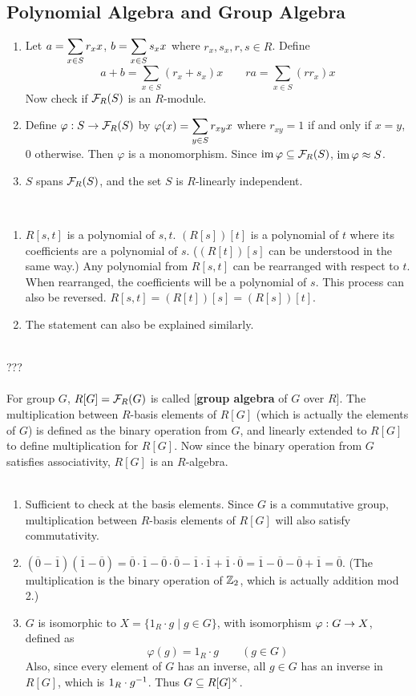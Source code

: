 \subsection{Polynomial Algebra and Group Algebra}
\begin{enumerate}
	\item Let $\displaystyle a = \sum_{x\in S} r_x x$, $\displaystyle b = \sum_{x\in S}s_x x$ where $r_x, s_x, r, s\in R$. Define
	$$a+b = \sum_{x\in S}(r_x+s_x)x \qquad ra = \sum_{x\in S}(rr_x)x$$
	Now check if $\mathcal{F}_R(S)$ is an $R$-module.
	\item Define $\varphi: S\rightarrow \mathcal{F}_R(S)$ by $\varphi(x) = \displaystyle \sum_{y\in S} r_{xy} x$ where $r_{xy} = 1$ if and only if $x = y$, 0 otherwise. Then $\varphi$ is a monomorphism. Since $\operatorname{im} \varphi \subseteq \mathcal{F}_R(S)$, $\operatorname{im} \varphi \approx S$.
	\item $S$ spans $\mathcal{F}_R(S)$, and the set $S$ is $R$-linearly independent.
\end{enumerate}~
\\
\begin{enumerate}
	\item $R[s, t]$ is a polynomial of $s, t$. $(R[s])[t]$ is a polynomial of $t$ where its coefficients are a polynomial of $s$. ($(R[t])[s]$ can be understood in the same way.) Any polynomial from $R[s, t]$ can be rearranged with respect to $t$. When rearranged, the coefficients will be a polynomial of $s$. This process can also be reversed. $R[s, t] = (R[t])[s] = (R[s])[t]$.
	\item The statement can also be explained similarly.
\end{enumerate}~
\\
 ???\\
\\
 For group $G$, $R[G] = \mathcal{F}_R(G)$ is called [\textbf{group algebra} of $G$ over $R$]. The multiplication between $R$-basis elements of $R[G]$ (which is actually the elements of $G$) is defined as the binary operation from $G$, and linearly extended to $R[G]$ to define multiplication for $R[G]$. Now since the binary operation from $G$ satisfies associativity, $R[G]$ is an $R$-algebra.\\
\\
\begin{enumerate}
	\item Sufficient to check at the basis elements. Since $G$ is a commutative group, multiplication between $R$-basis elements of $R[G]$ will also satisfy commutativity.
	\item $(\overline{0} - \overline{1})(\overline{1}-\overline{0}) = \overline{0}\cdot \overline{1} - \overline{0}\cdot\overline{0} - \overline{1}\cdot\overline{1}+\overline{1}\cdot\overline{0} = \overline{1} - \overline{0} - \overline{0} + \overline{1} = \overline{0}$. (The multiplication is the binary operation of $\mathbb{Z}_2$, which is actually addition mod 2.)
	\item $G$ is isomorphic to $X = \{1_R\cdot g \mid g\in G\}$, with isomorphism $\varphi: G\rightarrow X$, defined as $$\varphi(g) = 1_R\cdot g \qquad (g\in G)$$
	Also, since every element of $G$ has an inverse, all $g\in G$ has an inverse in $R[G]$, which is $1_R\cdot g^{-1}$. Thus $G\subseteq R[G]^\times$.
\end{enumerate}~
